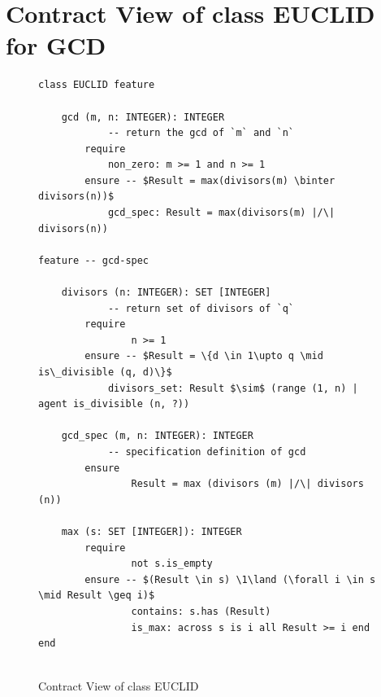 \documentclass[runningheads,12pt]{article}
\begin{document}



\appendix

\section{Contract View of class EUCLID for GCD}

\begin{figure}[!htb]
\begin{framed}
\caption{Contract View of class EUCLID}
\label{fig:contract-view}
\lstset{language=eiffel}    
\begin{lstlisting}
class EUCLID feature

	gcd (m, n: INTEGER): INTEGER
			-- return the gcd of `m` and `n`
		require
			non_zero: m >= 1 and n >= 1
		ensure -- $Result = max(divisors(m) \binter divisors(n))$
			gcd_spec: Result = max(divisors(m) |/\| divisors(n))
	
feature -- gcd-spec

	divisors (n: INTEGER): SET [INTEGER]
			-- return set of divisors of `q`
		require
				n >= 1
		ensure -- $Result = \{d \in 1\upto q \mid is\_divisible (q, d)\}$
			divisors_set: Result $\sim$ (range (1, n) | agent is_divisible (n, ?))

	gcd_spec (m, n: INTEGER): INTEGER
			-- specification definition of gcd
		ensure
				Result = max (divisors (m) |/\| divisors (n))

	max (s: SET [INTEGER]): INTEGER
		require
				not s.is_empty
		ensure -- $(Result \in s) \1\land (\forall i \in s \mid Result \geq i)$
				contains: s.has (Result)
				is_max: across s is i all Result >= i end
end
				
\end{lstlisting}
\end{framed}
\end{figure}
\end{document}
